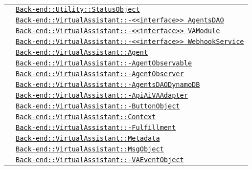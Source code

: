\begin{longtable}{|>{\centering}m{3cm}|m{10cm}<{\centering}|}
& \hyperref[Back-end::Utility::StatusObject]{\texttt{Back-end::Utility::StatusObject}}\\
& \hyperref[Back-end::VirtualAssistant::<<interface>> AgentsDAO]{\texttt{Back-end::VirtualAssistant::-\linebreak <<interface>> AgentsDAO}}\\
& \hyperref[Back-end::VirtualAssistant::<<interface>> VAModule]{\texttt{Back-end::VirtualAssistant::-\linebreak <<interface>> VAModule}}\\
& \hyperref[Back-end::VirtualAssistant::<<interface>> WebhookService]{\texttt{Back-end::VirtualAssistant::-\linebreak <<interface>> WebhookService}}\\
& \hyperref[Back-end::VirtualAssistant::Agent]{\texttt{Back-end::VirtualAssistant::Agent}}\\
& \hyperref[Back-end::VirtualAssistant::AgentObservable]{\texttt{Back-end::VirtualAssistant::-\linebreak AgentObservable}}\\
& \hyperref[Back-end::VirtualAssistant::AgentObserver]{\texttt{Back-end::VirtualAssistant::-\linebreak AgentObserver}}\\
& \hyperref[Back-end::VirtualAssistant::AgentsDAODynamoDB]{\texttt{Back-end::VirtualAssistant::-\linebreak AgentsDAODynamoDB}}\\
& \hyperref[Back-end::VirtualAssistant::ApiAiVAAdapter]{\texttt{Back-end::VirtualAssistant::-\linebreak ApiAiVAAdapter}}\\
& \hyperref[Back-end::VirtualAssistant::ButtonObject]{\texttt{Back-end::VirtualAssistant::-\linebreak ButtonObject}}\\
& \hyperref[Back-end::VirtualAssistant::Context]{\texttt{Back-end::VirtualAssistant::Context}}\\
& \hyperref[Back-end::VirtualAssistant::Fulfillment]{\texttt{Back-end::VirtualAssistant::-\linebreak Fulfillment}}\\
& \hyperref[Back-end::VirtualAssistant::Metadata]{\texttt{Back-end::VirtualAssistant::Metadata}}\\
& \hyperref[Back-end::VirtualAssistant::MsgObject]{\texttt{Back-end::VirtualAssistant::MsgObject}}\\
& \hyperref[Back-end::VirtualAssistant::VAEventObject]{\texttt{Back-end::VirtualAssistant::-\linebreak VAEventObject}}\\

\end{longtable}
